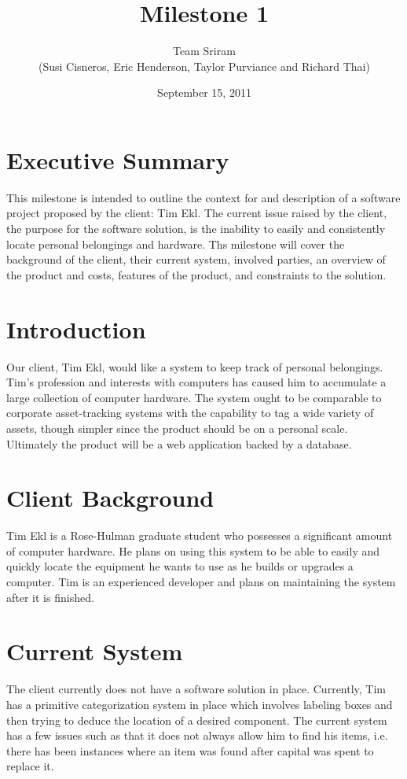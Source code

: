 \documentclass{article}
\begin{document}
\setlength{\voffset}{3.5in}
\title{Milestone 1}
\author{Team Sriram\\
(Susi Cisneros, Eric Henderson, Taylor Purviance and Richard Thai)}
\date{September 15, 2011}
\maketitle
\clearpage
\setlength{\voffset}{0pt}
\tableofcontents
\clearpage
\section{Executive Summary}
This milestone is intended to outline the context for and description of a software project proposed by the client: Tim Ekl. The current issue raised by the client, the purpose for the software solution, is the inability to easily and consistently locate personal belongings and hardware. Ths milestone will cover the background of the client, their current system, involved parties, an overview of the product and costs, features of the product, and constraints to the solution.

\section{Introduction}
Our client, Tim Ekl, would like a system to keep track of personal belongings. Tim's profession and interests with computers has caused him to accumulate a large collection of computer hardware. The system ought to be comparable to corporate asset-tracking systems with the capability to tag a wide variety of assets, though simpler since the product should be on a personal scale. Ultimately the product will be a web application backed by a database.

\section{Client Background}
Tim Ekl is a Rose-Hulman graduate student who possesses a significant amount of computer hardware.  He plans on using this system to be able to easily and quickly locate the equipment he wants to use as he builds or upgrades a computer.  Tim is an experienced developer and plans on maintaining the system after it is finished.  

\section{Current System}
The client currently does not have a software solution in place.  Currently, Tim has a primitive categorization system in place which involves labeling boxes and then trying to deduce the location of a desired component.  The current system has a few issues such as that it does not always allow him to find his items, i.e. there has been instances where an item was found after capital was spent to replace it.
\end{document}
